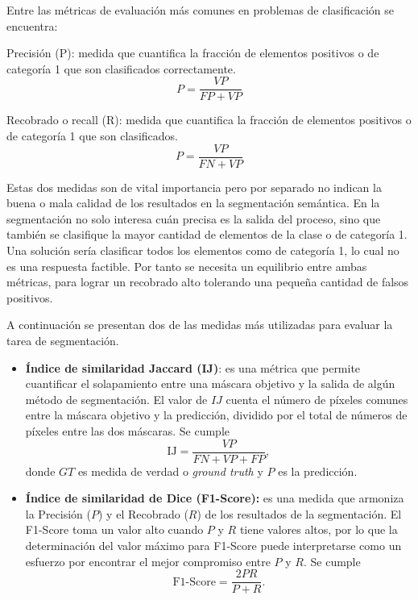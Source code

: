 Entre las métricas de evaluación más comunes en problemas de clasificación se encuentra:

\begin{definition}
	Precisión (P): medida que cuantifica la fracción de elementos positivos o de categoría 1 que son clasificados correctamente. 
	$$ P = \frac{VP}{FP + VP}$$	
\end{definition}

\begin{definition}
	Recobrado o recall (R): medida que cuantifica la fracción de elementos positivos o de categoría 1 que son clasificados.
	$$ P = \frac{VP}{FN + VP}$$	
\end{definition}

Estas dos medidas son de vital importancia pero por separado no indican la buena o mala calidad de los resultados en la segmentación semántica. En la segmentación no solo interesa cuán precisa es la salida del proceso, sino que también se clasifique la mayor cantidad de elementos de la clase o de categoría 1. Una solución sería clasificar todos los elementos como de categoría 1, lo cual no es una respuesta factible. Por tanto se necesita un equilibrio entre ambas métricas, para lograr un recobrado alto tolerando una pequeña cantidad de falsos positivos.

A continuación se presentan dos de las medidas más utilizadas para evaluar la tarea de segmentación.

\begin{itemize}
	\item \textbf{Índice de similaridad Jaccard (IJ)}: es una métrica que permite cuantificar el solapamiento entre una máscara objetivo y la salida de algún método de segmentación. El valor de $IJ$ cuenta el número de píxeles comunes entre la máscara objetivo y la predicción, dividido por el total de números de píxeles entre las dos máscaras. Se cumple
	\begin{equation}
		\text{IJ} = \frac{VP}{FN + VP + FP},
	\end{equation}
donde $GT$ es medida de verdad o \textit{ground truth} y $P$ es la predicción.
	
	\item \textbf{Índice de similaridad de Dice (F1-Score):} es una medida que armoniza la Precisión ($P$) y el Recobrado ($R$) de los resultados de la segmentación. El F1-Score toma un valor alto cuando $P$ y $R$ tiene valores altos, por lo que la determinación del valor máximo para F1-Score puede interpretarse como un esfuerzo por encontrar el mejor compromiso entre $P$ y $R$. Se cumple
	\begin{equation}
		\text{F1-Score} = \frac{2PR}{P + R}.
	\end{equation}
\end{itemize}

